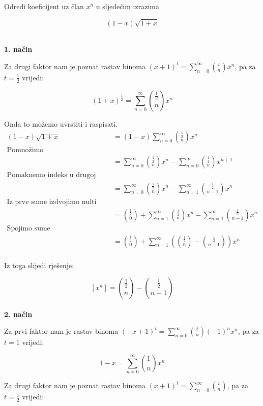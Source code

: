 \documentclass[exam.tex]{subfiles}
\begin{document}
	\begin{subtask}
		Odredi koeficijent uz član \( x^n \) u sljedećim izrazima
	
		\[ (1 - x) \sqrt{1 + x} \] \\
	\end{subtask}
	
	\textbf{1. način}
	
	Za drugi faktor nam je poznat rastav binoma \( (x + 1)^t = \sum\limits^\infty_{n=0} \binom{t}{n} x^n \), pa za \( t = \frac{1}{2} \) vrijedi:
	
	\[ (1 + x)^{\frac{1}{2}} = \sum\limits^\infty_{n=0} \binom{\frac{1}{2}}{n} x^n \]
	
	Onda to možemo uvrstiti i raspisati.
	\begin{align*}
		(1 - x) \sqrt{1 + x} &= (1 - x) \sum\limits^\infty_{n=0} \binom{\frac{1}{2}}{n} x^n \\
		\text{Pomnožimo} \\
		&= \sum\limits^\infty_{n=0} \binom{\frac{1}{2}}{n} x^n - \sum\limits^\infty_{n=0} \binom{\frac{1}{2}}{n} x^{n + 1} \\
		\text{Pomaknemo indeks u drugoj sumi} \\
		&= \sum\limits^\infty_{n=0} \binom{\frac{1}{2}}{n} x^n - \sum\limits^\infty_{n=1} \binom{\frac{1}{2}}{n - 1} x^{n} \\
		\text{Iz prve sume izdvojimo nulti element} \\
		&= \binom{\frac{1}{2}}{0} + \sum\limits^\infty_{n=1} \binom{\frac{1}{2}}{n} x^n - \sum\limits^\infty_{n=1} \binom{\frac{1}{2}}{n - 1} x^{n} \\
		\text{Spojimo sume} \\
		&= \binom{\frac{1}{2}}{0} + \sum\limits^\infty_{n=1} \left ( \binom{\frac{1}{2}}{n} -  \binom{\frac{1}{2}}{n - 1} \right ) x^{n} \\
	\end{align*}
	
	Iz toga slijedi rješenje:
	
	\[ [x^n] = \binom{\frac{1}{2}}{n} - \binom{\frac{1}{2}}{n - 1} \] 	\\
	
	\textbf{2. način}
	
	Za prvi faktor nam je rastav binoma \( (-x + 1)^t = \sum\limits^\infty_{n=0} \binom{t}{n} (-1)^n x^n \), pa za \( t = 1 \) vrijedi:
	
	\[ 1 - x = \sum\limits^\infty_{n=0} \binom{1}{n} x^n \]
	
	Za drugi faktor nam je poznat rastav binoma \( (x + 1)^t = \sum\limits^\infty_{n=0} \binom{t}{n} \), pa za \( t = \frac{1}{2} \) vrijedi:
	
\end{document}
